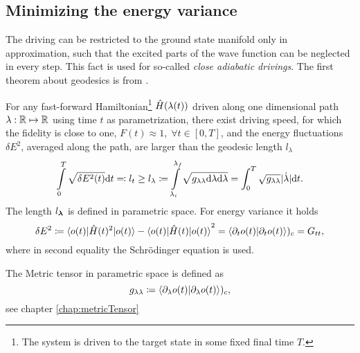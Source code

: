 






\subsection{Minimizing the energy variance}
The driving can be restricted to the ground state manifold only in approximation, such that the excited parts of the wave function can be neglected in every step. This fact is used for so-called \emph{close adiabatic drivings}. The first theorem about geodesics is from \citet{Bukov2019}.

\begin{thm}
    \label{thm:polkovnikov}
    For any fast-forward Hamiltonian\footnote{The system is driven to the target state in some fixed final time $T$.} $\hat{H}(\lambda(t))$ driven along one dimensional path $\lambda: \mathbb{R}\mapsto \mathbb{R}$ using time $t$ as parametrization, there exist driving speed, for which the fidelity is close to one, $F(t)\approx 1, \;\forall t\in[0,T]$, and the energy fluctuations $\delta E^2$, averaged along the path, are larger than the geodesic length $l_\lambda$
    \begin{equation}
        \int\limits_0^{T}\sqrt{\delta E^2(t)}\mathrm{d} t \eqqcolon l_t\geq l_\lambda \coloneqq \int\limits_{\lambda_i}^{\lambda_f} \sqrt{g_{\lambda\lambda}\mathrm{d} \lambda\mathrm{d} \lambda} =\int_0^{T} \sqrt{g_{\lambda\lambda}}|\dot \lambda|\mathrm{d} t.
    \end{equation}
    The length $l_{\bm\lambda}$ is defined in parametric space. For energy variance it holds
    \begin{equation}
        \delta E^2\coloneqq \braket{o(t)|\hat{H}(t)^2|o(t)}-\braket{o(t)|\hat{H}(t)|o(t)}^2=\braket{\partial_t  o(t)|\partial_t o(t)})_c=G_{tt},
    \end{equation}    
    where in second equality the Schr\"odinger equation is used. 
    
    The Metric tensor in parametric space is defined as
    \begin{equation}
        g_{\lambda\lambda}\coloneqq \braket{\partial_\lambda o(t)|\partial_\lambda o(t)})_c,
    \end{equation}
    see chapter \ref{chap:metricTensor}
\end{thm}


